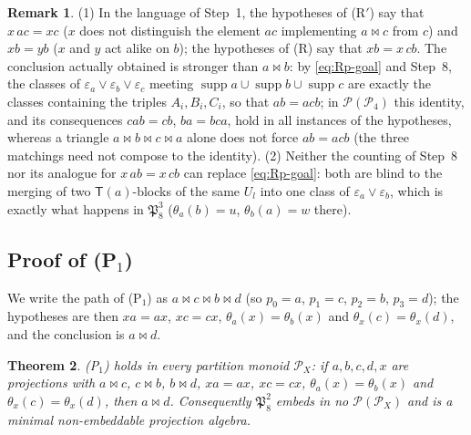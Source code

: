 \documentclass[11pt]{amsart}
\newtheorem{theorem}{Theorem}[section]
\theoremstyle{definition}
\newtheorem{remark}[theorem]{Remark}
\renewcommand{\P}{\mathcal{P}}
\newcommand{\supp}{\operatorname{supp}}
\newcommand{\T}{\mathsf{T}}
\newcommand{\mt}{\bowtie}   %
\begin{document}
\begin{remark}\label{rem:Rp}
(1) In the language of Step~1, the hypotheses of (R$'$) say that $x\,ac=xc$ ($x$ does not distinguish the element $ac$ implementing $a\mt c$ from $c$) and $xb=yb$ ($x$ and $y$ act alike on $b$); the hypotheses of (R) say that $xb=x\,cb$. The conclusion actually obtained is stronger than $a\mt b$: by \eqref{eq:Rp-goal} and Step~8, the classes of $\varepsilon_a\vee\varepsilon_b\vee\varepsilon_c$ meeting $\supp a\cup\supp b\cup\supp c$ are exactly the classes containing the triples $A_i,B_i,C_i$, so that $ab=acb$; in $\P(\P_4)$ this identity, and its consequences $cab=cb$, $ba=bca$, hold in all instances of the hypotheses, whereas a triangle $a\mt b\mt c\mt a$ alone does not force $ab=acb$ (the three matchings need not compose to the identity). (2) Neither the counting of Step~8 nor its analogue for $x\,ab=x\,cb$ can replace \eqref{eq:Rp-goal}: both are blind to the merging of two $\T(a)$-blocks of the same $U_l$ into one class of $\varepsilon_a\vee\varepsilon_b$, which is exactly what happens in $\mathfrak P_8^3$ ($\theta_a(b)=u$, $\theta_b(a)=w$ there).
\end{remark}

\subsection{Proof of (P$_1$)}\label{subsec:P1}

We write the path of (P$_1$) as $a\mt c\mt b\mt d$ (so $p_0=a$, $p_1=c$, $p_2=b$, $p_3=d$); the hypotheses are then $xa=ax$, $xc=cx$, $\theta_a(x)=\theta_b(x)$ and $\theta_x(c)=\theta_x(d)$, and the conclusion is $a\mt d$.

\begin{theorem}\label{thm:P1}
(P$_1$) holds in every partition monoid $\P_X$: if $a,b,c,d,x$ are projections with $a\mt c$, $c\mt b$, $b\mt d$, $xa=ax$, $xc=cx$, $\theta_a(x)=\theta_b(x)$ and $\theta_x(c)=\theta_x(d)$, then $a\mt d$. Consequently $\mathfrak P_8^2$ embeds in no $\P(\P_X)$ and is a minimal non-embeddable projection algebra.
\end{theorem}
\end{document}
